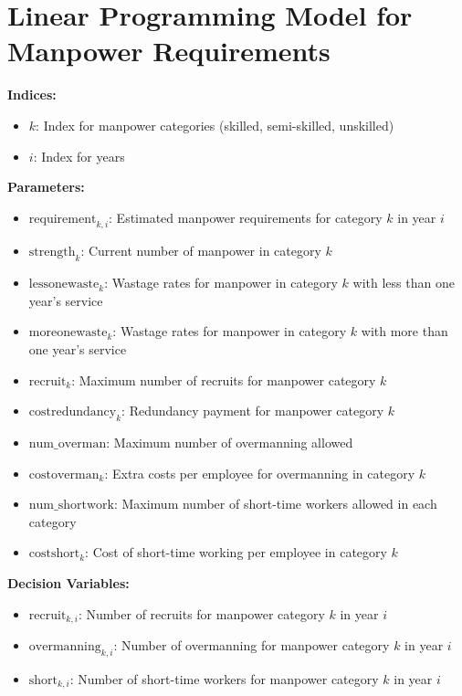 \documentclass{article}
\begin{document}
\section*{Linear Programming Model for Manpower Requirements}

\textbf{Indices:}
\begin{itemize}
    \item \( k \): Index for manpower categories (skilled, semi-skilled, unskilled)
    \item \( i \): Index for years
\end{itemize}

\textbf{Parameters:}
\begin{itemize}
    \item \( \text{requirement}_{k,i} \): Estimated manpower requirements for category \( k \) in year \( i \)
    \item \( \text{strength}_{k} \): Current number of manpower in category \( k \)
    \item \( \text{lessonewaste}_{k} \): Wastage rates for manpower in category \( k \) with less than one year's service
    \item \( \text{moreonewaste}_{k} \): Wastage rates for manpower in category \( k \) with more than one year's service
    \item \( \text{recruit}_{k} \): Maximum number of recruits for manpower category \( k \)
    \item \( \text{costredundancy}_{k} \): Redundancy payment for manpower category \( k \)
    \item \( \text{num\_overman} \): Maximum number of overmanning allowed
    \item \( \text{costoverman}_{k} \): Extra costs per employee for overmanning in category \( k \)
    \item \( \text{num\_shortwork} \): Maximum number of short-time workers allowed in each category
    \item \( \text{costshort}_{k} \): Cost of short-time working per employee in category \( k \)
\end{itemize}

\textbf{Decision Variables:}
\begin{itemize}
    \item \( \text{recruit}_{k,i} \): Number of recruits for manpower category \( k \) in year \( i \)
    \item \( \text{overmanning}_{k,i} \): Number of overmanning for manpower category \( k \) in year \( i \)
    \item \( \text{short}_{k,i} \): Number of short-time workers for manpower category \( k \) in year \( i \)
\end{itemize}
\end{document}
